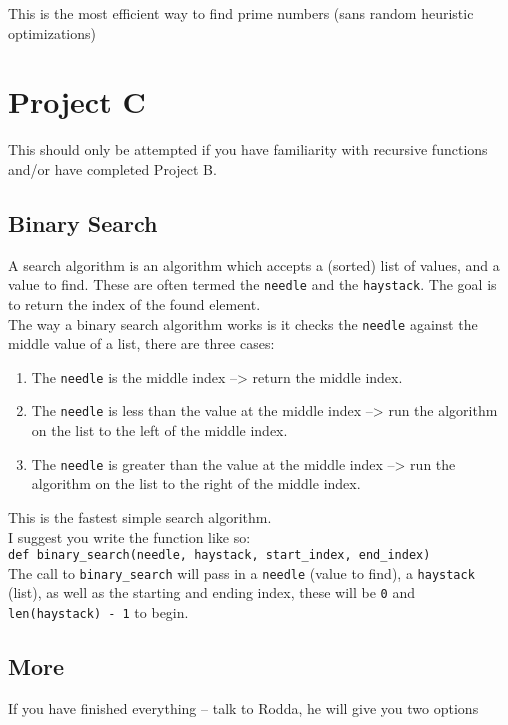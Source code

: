 \documentclass[11pt]{article}
\begin{document}
This is the most efficient way to find prime numbers (sans random heuristic optimizations)\\

\section{Project C}
\label{sec:org71ba7c5}
This should only be attempted if you have familiarity with recursive functions and/or have completed Project B.\\
\subsection{Binary Search}
\label{sec:orgec1b13e}
A search algorithm is an algorithm which accepts a (sorted) list of values, and a value to find.  These are often termed the \texttt{needle} and the \texttt{haystack}.  The goal is to return the index of the found element.\\

The way a binary search algorithm works is it checks the \texttt{needle} against the middle value of a list, there are three cases:\\
\begin{enumerate}
\item The \texttt{needle} is the middle index --> return the middle index.\\
\item The \texttt{needle} is less than the value at the middle index --> run the algorithm on the list to the left of the middle index.\\
\item The \texttt{needle} is greater than the value at the middle index --> run the algorithm on the list to the right of the middle index.\\
\end{enumerate}

This is the fastest simple search algorithm.\\

I suggest you write the function like so:\\
\texttt{def binary\_search(needle, haystack, start\_index, end\_index)}\\
The call to \texttt{binary\_search} will pass in a \texttt{needle} (value to find), a \texttt{haystack} (list), as well as the starting and ending index, these will be \texttt{0} and \texttt{len(haystack) - 1} to begin.\\
\subsection{More}
\label{sec:orgc611b74}
If you have finished everything -- talk to Rodda, he will give you two options\\
\end{document}
